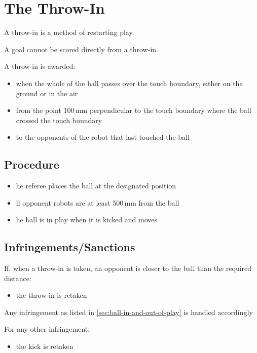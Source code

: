\section{The Throw-In}\label{sec:throw-in}

A throw-in is a method of restarting play.

A goal cannot be scored directly from a throw-in.

A throw-in is awarded:

\begin{itemize}
\item when the whole of the ball passes over the touch boundary, either on the ground or in the air
\item from the point 100\,mm perpendicular to the touch boundary where the ball crossed the touch boundary
\item to the opponents of the robot that last touched the ball
\end{itemize}

\subsection{Procedure}
\begin{itemize}
\item {}he referee places the ball at the designated position
\item {}ll opponent robots are at least 500\,mm from the ball
\item {}he ball is in play when it is kicked and moves
\end{itemize}

\subsection{Infringements/Sanctions}
If, when a throw-in is taken, an opponent is closer to the ball than the required distance:

\begin{itemize}
\item the throw-in is retaken
\end{itemize}

Any infringement as listed in \autoref{sec:ball-in-and-out-of-play} is handled accordingly

For any other infringement:

\begin{itemize}
\item the kick is retaken
\end{itemize}

